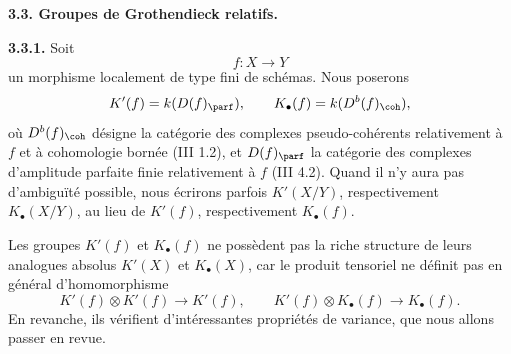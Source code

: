 \documentclass[11pt]{article}
\begin{document}
\textbf{3.3. Groupes de Grothendieck relatifs.}

\textbf{3.3.1.} Soit
\[
 f:X\longrightarrow Y
\]
un morphisme localement de type fini de schémas. Nous poserons
\[
 K'(f)=k(D(f)_{\parf}),\qquad
 K_{\bullet}(f)=k(D^b(f)_{\coh}),
\]
où \(D^b(f)_{\coh}\) désigne la catégorie des complexes pseudo-cohérents relativement à \(f\) et à cohomologie bornée (III 1.2), et \(D(f)_{\parf}\) la catégorie des complexes d'amplitude parfaite finie relativement à \(f\) (III 4.2). Quand il n'y aura pas d'ambiguïté possible, nous écrirons parfois \(K'(X/Y)\), respectivement \(K_{\bullet}(X/Y)\), au lieu de \(K'(f)\), respectivement \(K_{\bullet}(f)\).

Les groupes \(K'(f)\) et \(K_{\bullet}(f)\) ne possèdent pas la riche structure de leurs analogues absolus \(K'(X)\) et \(K_{\bullet}(X)\), car le produit tensoriel ne définit pas en général d'homomorphisme
\[
 K'(f)\otimes K'(f)\longrightarrow K'(f),
 \qquad
 K'(f)\otimes K_{\bullet}(f)\longrightarrow K_{\bullet}(f).
\]
En revanche, ils vérifient d'intéressantes propriétés de variance, que nous allons passer en revue.
\end{document}
